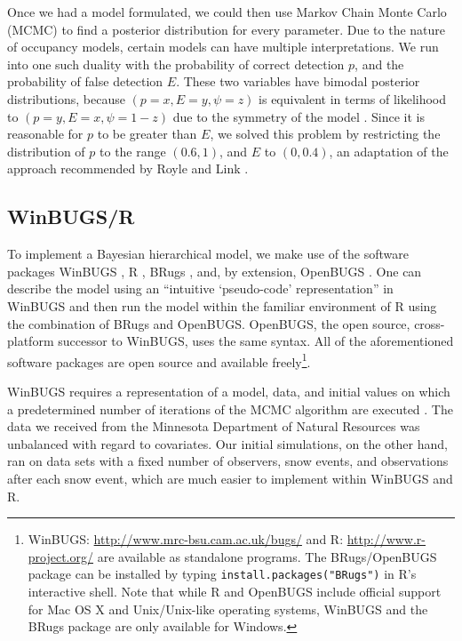 \documentclass[12pt]{article}
\begin{document}
    Once we had a model formulated, we could then use Markov Chain Monte Carlo
    (MCMC) to find a posterior distribution for every parameter. Due to the
    nature of occupancy models, certain models can have multiple
    interpretations.
    We run into one such duality with the probability of correct detection
    \(p\), and the probability of false detection \(E\). These two variables
    have bimodal posterior distributions, because \((p=x,E=y,\psi=z)\) is
    equivalent in terms of likelihood to \((p=y,E=x,\psi=1-z)\) due to the
    symmetry of the model \cite{Royle2006}.  Since it is reasonable
    for \(p\) to be greater than \(E\), we solved this problem by restricting
    the distribution of \(p\) to the range \((0.6,1)\), and \(E\) to
    \((0,0.4)\), an adaptation of the approach recommended by Royle and
    Link \cite{Royle2006}.

    \subsection{WinBUGS/R}
    To implement a Bayesian hierarchical model, we make use of the software
    packages WinBUGS \cite{Lunn2000}, R \cite{R2009}, BRugs \cite{Thomas2008},
    and, by extension, OpenBUGS \cite{Thomas2006}. One can describe the model
    using an ``intuitive `pseudo-code' representation'' in WinBUGS
    \cite{MacKenzie2006} and then run the model within the familiar environment
    of R using the combination of BRugs and OpenBUGS. OpenBUGS, the open source,
    cross-platform successor to WinBUGS, uses the same syntax. All of the
    aforementioned software packages are open source and available
    freely\footnote{WinBUGS: \url{http://www.mrc-bsu.cam.ac.uk/bugs/} and R:
    \url{http://www.r-project.org/} are available as standalone programs. The
    BRugs/OpenBUGS package can be installed by typing
    \texttt{install.packages("BRugs")} in R's interactive shell. Note that while
    R and OpenBUGS include official support for Mac OS X and Unix/Unix-like
    operating systems, WinBUGS and the BRugs package are only available for
    Windows.}.

    WinBUGS requires a representation of a model, data, and initial values on
    which a predetermined number of iterations of the MCMC algorithm are
    executed \cite{MacKenzie2006}.
    The data we received from the
    Minnesota Department of Natural Resources was unbalanced with regard to
    covariates.
    Our initial simulations, on the other
    hand, ran on data sets with a fixed number of observers, snow events, and
    observations after each snow event, which are much easier to implement
    within WinBUGS and R.
\end{document}
